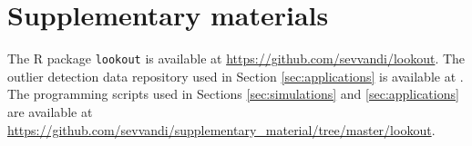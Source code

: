\documentclass[12pt]{article}
\theoremstyle{definition}
\theoremstyle{definition}
\theoremstyle{definition}
\theoremstyle{remark}
\begin{document}
\hypertarget{sec:suppmat}{%
\section{Supplementary materials}\label{sec:suppmat}}

The R package \texttt{lookout} is available at \url{https://github.com/sevvandi/lookout}.
The outlier detection data repository used in Section \ref{sec:applications} is available at \citet{datasets}.
The programming scripts used in Sections \ref{sec:simulations} and \ref{sec:applications} are available at \url{https://github.com/sevvandi/supplementary_material/tree/master/lookout}.



\end{document}
